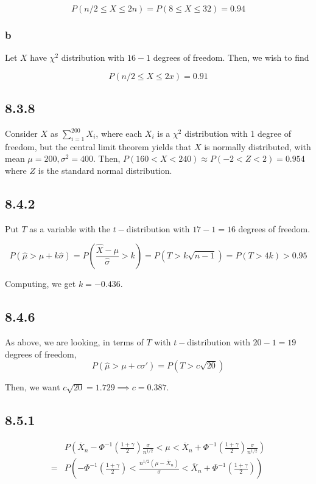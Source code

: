 \documentclass[12pt,letterpaper]{article}
\theoremstyle{definition}
\begin{document}
\[
  P(n/2 \leq X \leq 2n) = P(8 \leq X \leq 32) = 0.94
\]

\subsubsection*{b}

Let $X$ have $\chi^2$ distribution with $16 - 1$ degrees of freedom. Then, we wish to find

\[
  P(n/2 \leq X \leq 2x) = 0.91
\]

\subsection*{8.3.8}

Consider $X$ as $\sum_{i=1}^{200}X_i$, where each $X_i$ is a $\chi^2$
distribution with 1 degree of freedom, but the central limit theorem yields that
$X$ is normally distributed, with mean $\mu = 200, \sigma^2 = 400$. Then, $P(160
< X < 240) \approx P(-2 < Z < 2) = 0.954$ where $Z$ is the standard normal distribution.

\subsection*{8.4.2}

Put $T$ as a variable with the $t-$distribution with $17 - 1 = 16$ degrees of freedom.

\[
  P(\hat{\mu} > \mu + k\hat{\sigma}) = P(\frac{\hat{X}- \mu}{\hat{\sigma}} > k)
  = P(T > k\sqrt{n - 1}) = P(T > 4k) > 0.95
\]

Computing, we get $k = -0.436$.

\subsection*{8.4.6}

As above, we are looking, in terms of $T$ with $t-$distribution with $20 - 1
=19$ degrees of freedom,
\[
  P(\hat{\mu} > \mu + c\sigma') = P(T > c\sqrt{20})
\]

Then, we want $c\sqrt{20} = 1.729 \implies c = 0.387$.

\subsection*{8.5.1}

\begin{align*}
  &P\left( \overline{X}_n - \Phi^{-1}\left( \frac{1 + \gamma}{2} \right)\frac{\sigma}{n^{1/2}} < \mu < \overline{X}_n + \Phi^{-1}\left( \frac{1 + \gamma}{2} \right)\frac{\sigma}{n^{1/2}} \right) \\
  = &P\left(- \Phi^{-1}\left( \frac{1 + \gamma}{2} \right) < \frac{n^{1/2}(\mu - \overline{X}_n)}{\sigma} < \overline{X}_n + \Phi^{-1}\left( \frac{1 + \gamma}{2} \right) \right) \\
\end{align*}
\end{document}
